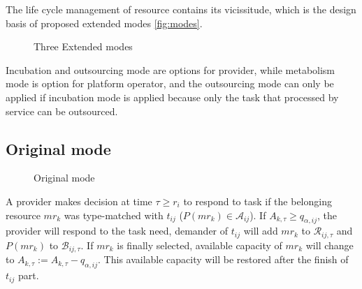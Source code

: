 The life cycle management of resource contains its vicissitude, which is the design basis of proposed extended modes \autoref{fig:modes}.
\begin{figure}[htbp]
    \centering
    \resizebox{\textwidth}{!}{}
    \caption{Three Extended modes}
    \label{fig:modes}
\end{figure}
Incubation and outsourcing mode are options for provider, while metabolism mode is option for platform operator, and the outsourcing mode can only be applied if incubation mode is applied because only the task that processed by service can be outsourced.


\subsection{Original mode} %
\label{sub:interactions_and_decisions}

\begin{figure}[htbp]
    \centering
    \resizebox{0.9\textwidth}{!}{}
    \caption{Original mode}
    \label{fig:originmode}
\end{figure}

A provider makes decision at time $\tau\ge r_i$ to respond  to task if the belonging resource $mr_k$ was type-matched with $t_{ij}$ ($P(mr_k)\in\mathcal{A}_{ij}$). If $A_{k,\tau} \ge q_{\alpha,ij}$, the provider will respond to the task need, demander of $t_{ij}$ will add $mr_k$ to $\mathcal{R}_{ij,\tau}$ and $P(mr_k)$ to $\mathcal{B}_{ij,\tau}$. If $mr_k$ is finally selected, available capacity of $mr_k$ will change to $A_{k,\tau} := A_{k,\tau} - q_{\alpha,ij}$. This available capacity will be restored after the finish of $t_{ij}$ part.

